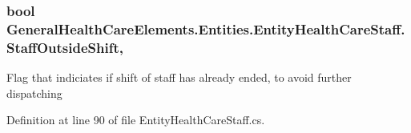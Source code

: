 \subsubsection[{\texorpdfstring{Staff\+Outside\+Shift}{StaffOutsideShift}}]{\setlength{\rightskip}{0pt plus 5cm}bool General\+Health\+Care\+Elements.\+Entities.\+Entity\+Health\+Care\+Staff.\+Staff\+Outside\+Shift\hspace{0.3cm}{\ttfamily [get]}, {\ttfamily [set]}}\hypertarget{class_general_health_care_elements_1_1_entities_1_1_entity_health_care_staff_ae0dd52d6060395967901a763dac269ea}{}\label{class_general_health_care_elements_1_1_entities_1_1_entity_health_care_staff_ae0dd52d6060395967901a763dac269ea}


Flag that indiciates if shift of staff has already ended, to avoid further dispatching 



Definition at line 90 of file Entity\+Health\+Care\+Staff.\+cs.

